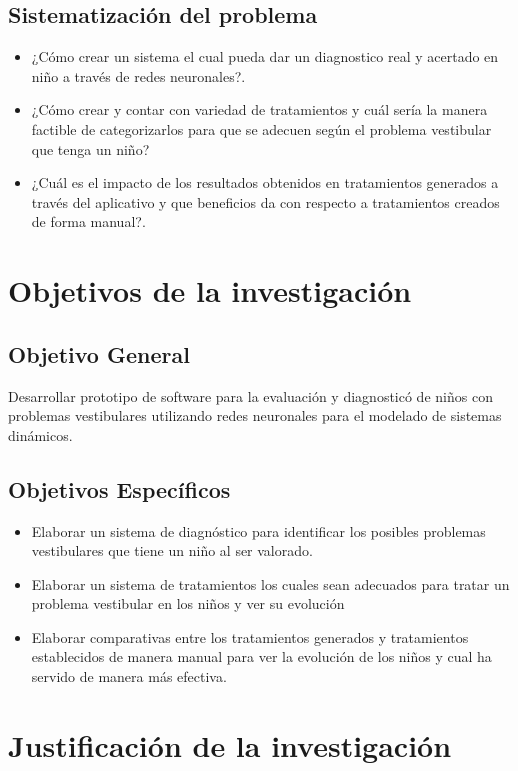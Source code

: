 	\subsection{Sistematización del problema}
		\begin{itemize}
			\item ¿Cómo crear un sistema el cual pueda dar un diagnostico real y acertado en niño a través de redes neuronales?.
			\item ¿Cómo crear y contar con variedad de tratamientos y cuál sería la manera factible de categorizarlos para que se adecuen según el problema vestibular que tenga un niño?
			\item ¿Cuál es el impacto de los resultados obtenidos en tratamientos generados a través del  aplicativo  y  que  beneficios  da  con  respecto  a  tratamientos creados de forma manual?.
		\end{itemize}
\newpage
\section{Objetivos de la investigación}
	\subsection{Objetivo General}
	Desarrollar prototipo de software para la evaluación y diagnosticó de niños con problemas vestibulares utilizando redes neuronales para el modelado de sistemas dinámicos.
	\subsection{Objetivos Específicos}
	\begin{itemize}
		\item Elaborar un sistema de diagnóstico para identificar los posibles problemas vestibulares que tiene un niño al ser valorado.
		\item Elaborar un sistema de tratamientos los cuales sean adecuados para tratar un problema vestibular en los niños y ver su evolución
		\item Elaborar comparativas entre los tratamientos generados y tratamientos establecidos de manera manual para ver la evolución de los niños y cual ha servido de manera más efectiva.
	\end{itemize}
\newpage
\section{Justificación de la investigación}
